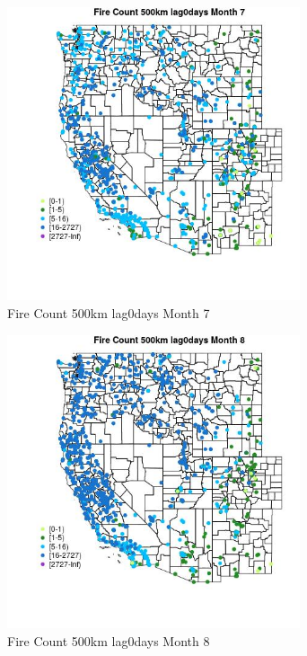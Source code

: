 \begin{figure} 
\centering  
\includegraphics[width=0.77\textwidth]{Code_Outputs/Report_ML_input_PM25_Step4_part_f_de_duplicated_aves_prioritize_24hr_obswNAs_MapObsMo7Fire_Count_500km_lag0days.jpg} 
\caption{\label{fig:Report_ML_input_PM25_Step4_part_f_de_duplicated_aves_prioritize_24hr_obswNAsMapObsMo7Fire_Count_500km_lag0days}Fire Count 500km lag0days Month 7} 
\end{figure} 
 

\begin{figure} 
\centering  
\includegraphics[width=0.77\textwidth]{Code_Outputs/Report_ML_input_PM25_Step4_part_f_de_duplicated_aves_prioritize_24hr_obswNAs_MapObsMo8Fire_Count_500km_lag0days.jpg} 
\caption{\label{fig:Report_ML_input_PM25_Step4_part_f_de_duplicated_aves_prioritize_24hr_obswNAsMapObsMo8Fire_Count_500km_lag0days}Fire Count 500km lag0days Month 8} 
\end{figure} 
 

